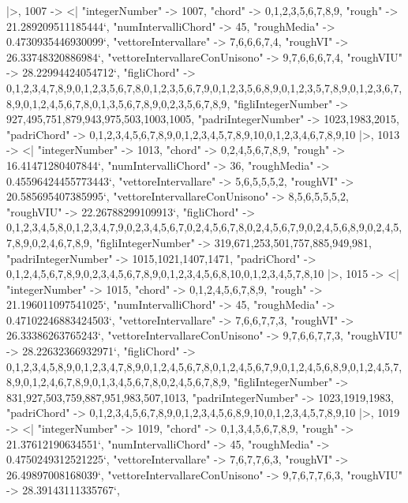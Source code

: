 \documentclass[
]{article}
\begin{document}
\begin{DatasetVerbatim}
  |>,
  1007 -> <|
    "integerNumber" -> 1007,
    "chord" -> {0,1,2,3,5,6,7,8,9},
    "rough" -> 21.289209511185444`,
    "numIntervalliChord" -> 45,
    "roughMedia" -> 0.4730935446930099`,
    "vettoreIntervallare" -> {7,6,6,6,7,4},
    "roughVI" -> 26.33748320886984`,
    "vettoreIntervallareConUnisono" -> {9,7,6,6,6,7,4},
    "roughVIU" -> 28.22994424054712`,
    "figliChord" -> {{0,1,2,3,4,7,8,9},{0,1,2,3,5,6,7,8},{0,1,2,3,5,6,7,9},{0,1,2,3,5,6,8,9},{0,1,2,3,5,7,8,9},{0,1,2,3,6,7,8,9},{0,1,2,4,5,6,7,8},{0,1,3,5,6,7,8,9},{0,2,3,5,6,7,8,9}},
    "figliIntegerNumber" -> {927,495,751,879,943,975,503,1003,1005},
    "padriIntegerNumber" -> {1023,1983,2015},
    "padriChord" -> {{0,1,2,3,4,5,6,7,8,9},{0,1,2,3,4,5,7,8,9,10},{0,1,2,3,4,6,7,8,9,10}}
  |>,
  1013 -> <|
    "integerNumber" -> 1013,
    "chord" -> {0,2,4,5,6,7,8,9},
    "rough" -> 16.41471280407844`,
    "numIntervalliChord" -> 36,
    "roughMedia" -> 0.45596424455773443`,
    "vettoreIntervallare" -> {5,6,5,5,5,2},
    "roughVI" -> 20.585695407385995`,
    "vettoreIntervallareConUnisono" -> {8,5,6,5,5,5,2},
    "roughVIU" -> 22.26788299109913`,
    "figliChord" -> {{0,1,2,3,4,5,8},{0,1,2,3,4,7,9},{0,2,3,4,5,6,7},{0,2,4,5,6,7,8},{0,2,4,5,6,7,9},{0,2,4,5,6,8,9},{0,2,4,5,7,8,9},{0,2,4,6,7,8,9}},
    "figliIntegerNumber" -> {319,671,253,501,757,885,949,981},
    "padriIntegerNumber" -> {1015,1021,1407,1471},
    "padriChord" -> {{0,1,2,4,5,6,7,8,9},{0,2,3,4,5,6,7,8,9},{0,1,2,3,4,5,6,8,10},{0,1,2,3,4,5,7,8,10}}
  |>,
  1015 -> <|
    "integerNumber" -> 1015,
    "chord" -> {0,1,2,4,5,6,7,8,9},
    "rough" -> 21.196011097541025`,
    "numIntervalliChord" -> 45,
    "roughMedia" -> 0.47102246883424503`,
    "vettoreIntervallare" -> {7,6,6,7,7,3},
    "roughVI" -> 26.33386263765243`,
    "vettoreIntervallareConUnisono" -> {9,7,6,6,7,7,3},
    "roughVIU" -> 28.22632366932971`,
    "figliChord" -> {{0,1,2,3,4,5,8,9},{0,1,2,3,4,7,8,9},{0,1,2,4,5,6,7,8},{0,1,2,4,5,6,7,9},{0,1,2,4,5,6,8,9},{0,1,2,4,5,7,8,9},{0,1,2,4,6,7,8,9},{0,1,3,4,5,6,7,8},{0,2,4,5,6,7,8,9}},
    "figliIntegerNumber" -> {831,927,503,759,887,951,983,507,1013},
    "padriIntegerNumber" -> {1023,1919,1983},
    "padriChord" -> {{0,1,2,3,4,5,6,7,8,9},{0,1,2,3,4,5,6,8,9,10},{0,1,2,3,4,5,7,8,9,10}}
  |>,
  1019 -> <|
    "integerNumber" -> 1019,
    "chord" -> {0,1,3,4,5,6,7,8,9},
    "rough" -> 21.37612190634551`,
    "numIntervalliChord" -> 45,
    "roughMedia" -> 0.4750249312521225`,
    "vettoreIntervallare" -> {7,6,7,7,6,3},
    "roughVI" -> 26.49897008168039`,
    "vettoreIntervallareConUnisono" -> {9,7,6,7,7,6,3},
    "roughVIU" -> 28.39143111335767`,

\end{DatasetVerbatim}
\end{document}
